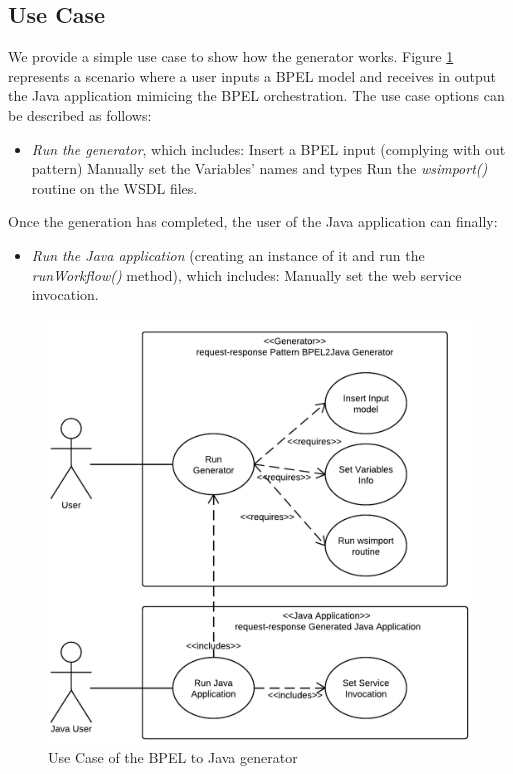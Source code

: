 \subsection{Use Case}
\label{sec:UseCase}
We provide a simple use case to show how the generator works. Figure \ref{fig:GeneratorUseCase} represents a scenario where a user inputs a BPEL model and receives in output the Java application mimicing the BPEL orchestration.
The use case options can be described as follows:
\begin{itemize}
 \item \textit{Run the generator}, which includes:
  \subitem Insert a BPEL input (complying with out pattern) 
  \subitem Manually set the Variables' names and types
  \subitem Run the \textit{wsimport()} routine on the WSDL files.
\end{itemize}
Once the generation has completed, the user of the Java application can finally:
\begin{itemize} 
 \item \textit{Run the Java application} (creating an instance of it and run the \textit{runWorkflow()} method), which includes:
  \subitem Manually set the web service invocation.
\end{itemize}

\begin{figure}
  \begin{center}
    \includegraphics[scale=1.5]{pictures/GeneratorUseCase.png}
    \caption{Use Case of the BPEL to Java generator}
    \label{fig:GeneratorUseCase}
  \end{center}
\end{figure}

